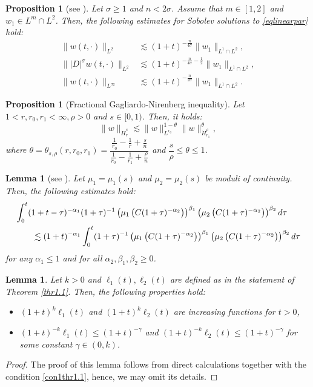 \documentclass[11pt,reqno]{amsart}
\newcommand{\di}{\displaystyle}
\numberwithin{equation}{section}
\newtheorem{lemma}[theorem]{Lemma}
\newtheorem{proposition}[theorem]{Proposition}
\begin{document}
\begin{proposition}[see \cite{PhamRei2017,ChenGirardi2025}] \label{Linear estimate par}
   Let $\sigma\geq 1$ and $n<2\sigma$. Assume that $m \in [1,2]$ and $w_1 \in L^m \cap L^2$. Then, the following estimates for Sobolev solutions to \eqref{eqlinearpar} hold:
   \begin{align*}
       \|w(t,\cdot)\|_{L^2}&\lesssim (1+t)^{-\frac{n}{4\sigma}}\|w_1\|_{L^1\cap L^2},\\
       \||D|^{\sigma}w(t,\cdot)\|_{L^2}&\lesssim (1+t)^{-\frac{n}{4\sigma}-\frac{1}{2}}\|w_1\|_{L^1\cap L^2},\\
       \|w(t,\cdot)\|_{L^\infty}&\lesssim (1+t)^{-\frac{n}{2\sigma}}\|w_1\|_{L^1\cap L^2}.      
   \end{align*}
\end{proposition}

\begin{proposition}[Fractional Gagliardo-Nirenberg inequality] \label{G-N}
Let $1<r, r_0, r_1<\infty, \rho>0$ and $s \in[0, 1)$. Then, it holds:
$$
\|w\|_{\dot{H}_r^s} \lesssim\|w\|_{L^{r_0}}^{1-\theta}\|w\|_{\dot{H}_{r_1}^\rho}^\theta,
$$
where $\theta=\theta_{s,\rho}\left(r, r_0, r_1\right)=\dfrac{\frac{1}{r_0}-\frac{1}{r}+\frac{s}{n}}{\frac{1}{r_0}-\frac{1}{r_1}+\frac{\rho}{n}}$ and $\dfrac{s}{\rho} \leq \theta \leq 1$.
\end{proposition}

\begin{lemma}[see \cite{AnhRei2021}] \label{integralmoduluslemma} 
Let $\mu_1=\mu_1(s)$ and $\mu_2=\mu_2(s)$ be moduli of continuity. Then, the following estimates hold:
\begin{align*}
\di &\int_0^t(1+t-\tau)^{-\alpha_1}(1+\tau)^{-1}\left(\mu_1\left(C(1+\tau)^{-\alpha_2}\right)\right)^{\beta_1}\left(\mu_2\left(C(1+\tau)^{-\alpha_2}\right)\right)^{\beta_2} d \tau\\
&\qquad\lesssim(1+t)^{-\alpha_1} \int_0^t(1+\tau)^{-1}\left(\mu_1\left(C(1+\tau)^{-\alpha_2}\right)\right)^{\beta_1}\left(\mu_2\left(C(1+\tau)^{-\alpha_2}\right)\right)^{\beta_2} d \tau
\end{align*}
for any $\alpha_1 \leq 1$ and for all $\alpha_2 ,\beta_1,\beta_2\geq 0$.
\end{lemma}

\begin{lemma}\label{ell1ell2}
    Let $k>0$ and $\ell_1(t),\ell_2(t)$ are defined as in the statement of Theorem \ref{thr1.1}. Then, the following properties hold:
    \begin{itemize}
        \item[\rm i.] $(1+t)^{k}\ell_1(t)$ and $(1+t)^{k}\ell_2(t)$ are increasing functions for $t>0$,
        \item[\rm ii.] $(1+t)^{-k}\ell_1(t)\leq (1+t)^{-\gamma}$ and $(1+t)^{-k}\ell_2(t)\leq (1+t)^{-\gamma}$ for some constant $\gamma\in (0,k)$.
    \end{itemize}

\end{lemma}
\begin{proof}
    The proof of this lemma follows from direct calculations together with the condition \eqref{con1thr1.1}, hence, we may omit its details.
\end{proof}
\end{document}
